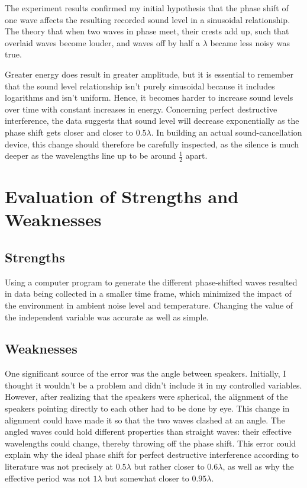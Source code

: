 \documentclass[index]{subfiles}
\begin{document}
The experiment results confirmed my initial hypothesis that the phase shift of one wave affects the resulting recorded sound level in a sinusoidal relationship. The theory that when two waves in phase meet, their crests add up, such that overlaid waves become louder, and waves off by half a \(\lambda\) became less noisy was true.

Greater energy does result in greater amplitude, but it is essential to remember that the sound level relationship isn't purely sinusoidal because it includes logarithms and isn't uniform. Hence, it becomes harder to increase sound levels over time with constant increases in energy.
Concerning perfect destructive interference, the data suggests that sound level will decrease exponentially as the phase shift gets closer and closer to \(0.5\lambda\). In building an actual sound-cancellation device, this change should therefore be carefully inspected, as the silence is much deeper as the wavelengths line up to be around \(\frac{1}{2}\) apart.

\section{Evaluation of Strengths and Weaknesses}

\subsection{Strengths}

Using a computer program to generate the different phase-shifted waves resulted in data being collected in a smaller time frame, which minimized the impact of the environment in ambient noise level and temperature. Changing the value of the independent variable was accurate as well as simple. 

\subsection{Weaknesses}

One significant source of the error was the angle between speakers. Initially, I thought it wouldn't be a problem and didn't include it in my controlled variables. However, after realizing that the speakers were spherical, the alignment of the speakers pointing directly to each other had to be done by eye. This change in alignment could have made it so that the two waves clashed at an angle. The angled waves could hold different properties than straight waves: their effective wavelengths could change, thereby throwing off the phase shift. This error could explain why the ideal phase shift for perfect destructive interference according to literature was not precisely at \(0.5\lambda\) but rather closer to \(0.6\lambda\), as well as why the effective period was not \(1\lambda\) but somewhat closer to \(0.95\lambda\).
\end{document}
